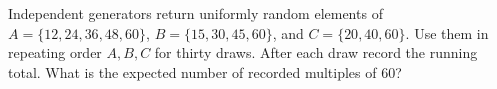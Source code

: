 Independent generators return uniformly random elements of $A=\{12,24,36,48,60\}$, $B=\{15,30,45,60\}$, and $C=\{20,40,60\}$. Use them in repeating order $A,B,C$ for thirty draws. After each draw record the running total. What is the expected number of recorded multiples of $60$?
